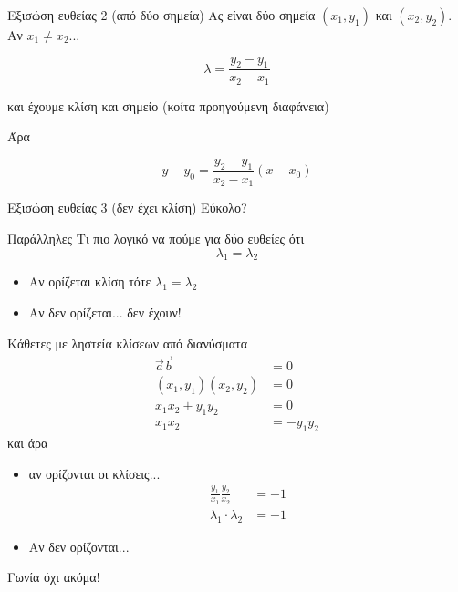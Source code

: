 \documentclass{presentation}
\begin{document}
\begin{frame}{Εξισώση ευθείας 2 (από δύο σημεία)}
  Ας είναι δύο σημεία $(x_1,y_1)$ και $(x_2,y_2)$. Αν $x_1\ne x_2$... \pause

  $$λ=\frac{y_2-y_1}{x_2-x_1}$$ \pause

  και έχουμε κλίση και σημείο (κοίτα προηγούμενη διαφάνεια) \pause

  Άρα

  $$y-y_0=\frac{y_2-y_1}{x_2-x_1}(x-x_0)$$
\end{frame}

\begin{frame}{Εξισώση ευθείας 3 (δεν έχει κλίση)}
  Εύκολο?
\end{frame}

\begin{frame}{Παράλληλες}
  Τι πιο λογικό να πούμε για δύο ευθείες ότι
  $$λ_1=λ_2$$
  \begin{itemize}[<+(2)->]
    \item Αν ορίζεται κλίση τότε $λ_1=λ_2$
    \item Αν δεν ορίζεται... δεν έχουν!
  \end{itemize}
\end{frame}

\begin{frame}{Κάθετες}
  με ληστεία κλίσεων από διανύσματα
  \begin{align*}
    \vec{a}\vec{b}     & =0       \\
    (x_1,y_1)(x_2,y_2) & =0       \\
    x_1x_2+y_1y_2      & =0       \\
    x_1x_2             & =-y_1y_2
  \end{align*}
  και άρα
  \begin{itemize}[<+(1)->]
    \item αν ορίζονται οι κλίσεις...
          \begin{align*}
            \frac{y_1}{x_1}\frac{y_2}{x_2} & =-1 \\
            λ_1\cdot λ_2                   & =-1
          \end{align*}
    \item Αν δεν ορίζονται...
  \end{itemize}

\end{frame}

\begin{frame}{Γωνία}
  όχι ακόμα!
\end{frame}
\end{document}
